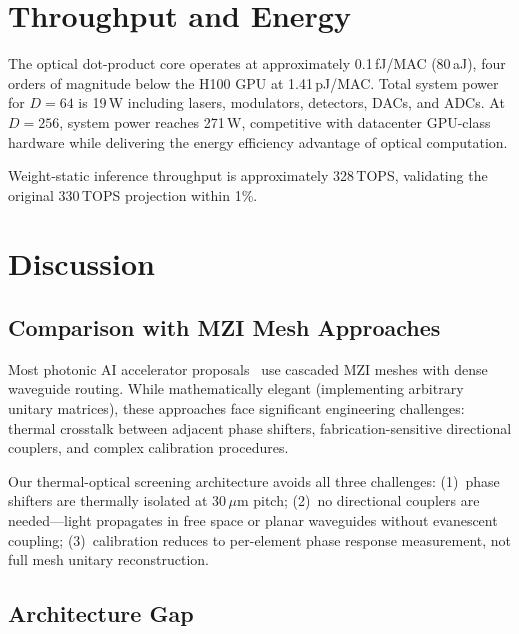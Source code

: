 \documentclass[conference]{IEEEtran}
\begin{document}
\section{Throughput and Energy}

The optical dot-product core operates at approximately 0.1\,fJ/MAC
(80\,aJ), four orders of magnitude below the H100 GPU at 1.41\,pJ/MAC.
Total system power for $D=64$ is 19\,W including lasers, modulators,
detectors, DACs, and ADCs. At $D=256$, system power reaches 271\,W,
competitive with datacenter GPU-class hardware while delivering
the energy efficiency advantage of optical computation.

Weight-static inference throughput is approximately 328\,TOPS,
validating the original 330\,TOPS projection within 1\%.

\section{Discussion}

\subsection{Comparison with MZI Mesh Approaches}

Most photonic AI accelerator proposals~\cite{shen2017deep,clements2016optimal}
use cascaded MZI meshes with dense waveguide routing. While
mathematically elegant (implementing arbitrary unitary matrices),
these approaches face significant engineering challenges: thermal
crosstalk between adjacent phase shifters, fabrication-sensitive
directional couplers, and complex calibration procedures.

Our thermal-optical screening architecture avoids all three challenges:
(1)~phase shifters are thermally isolated at 30\,$\mu$m pitch;
(2)~no directional couplers are needed---light propagates in free
space or planar waveguides without evanescent coupling;
(3)~calibration reduces to per-element phase response measurement,
not full mesh unitary reconstruction.

\subsection{Architecture Gap}
\end{document}
